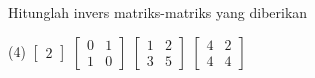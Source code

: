 \begin{exercise}
Hitunglah invers matriks-matriks yang diberikan
\begin{tasks}(4)
\task
$\begin{bmatrix}
2
\end{bmatrix}$
\task
$\begin{bmatrix}
0 & 1 \\
1 & 0
\end{bmatrix}$
\task
$\begin{bmatrix}
1 & 2 \\
3 & 5
\end{bmatrix}$
\task
$\begin{bmatrix}
4 & 2 \\
4 & 4
\end{bmatrix}$
\end{tasks}
\end{exercise}

